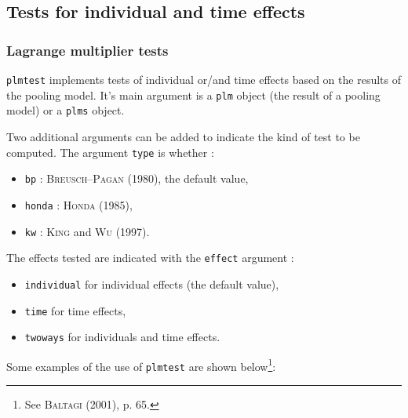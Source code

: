 \documentclass[a4paper]{article}
\begin{document}
\subsection{Tests for individual and time effects}



\subsubsection{Lagrange multiplier tests}

\texttt{plmtest} implements tests of individual or/and time effects  based on the results
of the pooling model. It's main argument is a
\texttt{plm} object (the result of a pooling model) or a
\texttt{plms} object.

Two additional arguments can be added to indicate the kind of test to
be computed. The argument \texttt{type} is whether :

\begin{itemize}
\item \texttt{bp} : \textsc{Breusch--Pagan} (1980), the default value,
\item \texttt{honda} : \textsc{Honda} (1985),
\item \texttt{kw} : \textsc{King} and \textsc{Wu} (1997).
\end{itemize}

The effects tested are indicated with the  \texttt{effect} argument :

\begin{itemize}
\item \texttt{individual} for individual effects  (the default value),
\item \texttt{time} for time effects,
\item \texttt{twoways} for individuals and time effects.
\end{itemize}

Some examples of the use of \texttt{plmtest} are shown below\footnote{See \textsc{Baltagi} (2001), p. 65.}:
\end{document}
